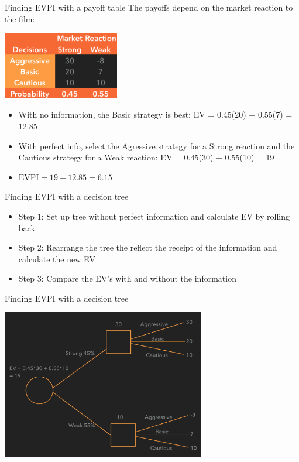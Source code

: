 \documentclass{beamer}\usepackage[]{graphicx}\usepackage[]{color}
\begin{document}
\begin{darkframes}
    \begin{frame}[fragile]{Finding EVPI with a payoff table}
      The payoffs depend on the market reaction to the film:
        \begin{center}
        \includegraphics[width=2in]{BevoPayoffs} 
        \end{center}
        \begin{itemize} [<+->]
          \item With no information, the Basic strategy is best: EV = 0.45(20) + 0.55(7) = 12.85
          \item With perfect info, select the Agressive strategy for a Strong reaction and the Cautious strategy for a Weak reaction: EV = 0.45(30) + 0.55(10) = 19
          \item $\text{EVPI} = 19 - 12.85 = 6.15$
        \end{itemize}        
    \end{frame}     



    \begin{frame}[fragile]{Finding EVPI with a decision tree}
          \begin{itemize} [<+->]
            \item Step 1: Set up tree without perfect information and calculate EV by rolling back
            \item Step 2: Rearrange the tree the reflect the receipt of the information and calculate the new EV
            \item Step 3: Compare the EV's with and without the information
          \end{itemize}          

    \end{frame}


    \begin{frame}[fragile]{Finding EVPI with a decision tree}
      \fontsize{10}{10}\selectfont

        \begin{center}
        \includegraphics[width=3.5in]{BevoPerfectInfo} 
        \end{center}
    

\end{frame}
\end{darkframes}
\end{document}
